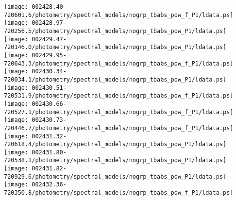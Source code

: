 \documentclass{aastex}
\begin{document}
\begin{figure*}[!ht]
\centering
\texttt{[image: 002428.40-720601.6/photometry/spectral\_models/nogrp\_tbabs\_pow\_f\_P1/ldata.ps]} \hfill 
\texttt{[image: 002428.97-720256.5/photometry/spectral\_models/nogrp\_tbabs\_pow\_P1/ldata.ps]} \hfill 
\texttt{[image: 002429.47-720146.0/photometry/spectral\_models/nogrp\_tbabs\_pow\_P1/ldata.ps]} \\ 
\vspace*{0.5in}
\texttt{[image: 002429.95-720643.3/photometry/spectral\_models/nogrp\_tbabs\_pow\_f\_P1/ldata.ps]} \hfill 
\texttt{[image: 002430.34-720034.1/photometry/spectral\_models/nogrp\_tbabs\_pow\_P1/ldata.ps]} \hfill 
\texttt{[image: 002430.51-720531.9/photometry/spectral\_models/nogrp\_tbabs\_pow\_f\_P1/ldata.ps]} \\ 
\vspace*{0.5in}
\texttt{[image: 002430.66-720527.1/photometry/spectral\_models/nogrp\_tbabs\_pow\_f\_P1/ldata.ps]} \hfill 
\texttt{[image: 002430.73-720446.7/photometry/spectral\_models/nogrp\_tbabs\_pow\_f\_P1/ldata.ps]} \hfill 
\texttt{[image: 002431.32-720618.4/photometry/spectral\_models/nogrp\_tbabs\_pow\_P1/ldata.ps]} \\ 
\vspace*{0.5in}
\texttt{[image: 002431.80-720538.1/photometry/spectral\_models/nogrp\_tbabs\_pow\_P1/ldata.ps]} \hfill 
\texttt{[image: 002431.82-720929.6/photometry/spectral\_models/nogrp\_tbabs\_pow\_P1/ldata.ps]} \hfill 
\texttt{[image: 002432.36-720350.8/photometry/spectral\_models/nogrp\_tbabs\_pow\_f\_P1/ldata.ps]} \\ 
\vspace*{0.5in}
\end{figure*}
\clearpage
\end{document}
